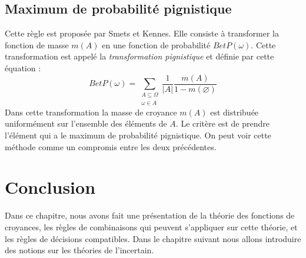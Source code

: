\subsection{Maximum de probabilité pignistique}

Cette règle est proposée par Smets et Kennes. Elle consiste à transformer la fonction
de masse $m(A)$ en une fonction de probabilité $BetP(\omega)$. Cette transformation
est appelé la \emph{transformation pignistique} et définie par cette équation :
\begin{equation}
BetP(\omega) = \sum_{\substack{A \subseteq \Omega \\
\omega \in A}} \frac{1}{|A|}  \frac{m(A)}{1-m(\varnothing)}
\end{equation}
Dans cette transformation la masse de croyance $m(A)$ est distribuée uniformément
sur l’ensemble des éléments de $A$. Le critère est de prendre l'élément qui a le
maximum de probabilité pignistique. On peut voir cette méthode comme un compromis
entre les deux précédentes.

{}
\section*{Conclusion}

Dans ce chapitre, nous avons fait une présentation de la théorie des fonctions de
croyances, les règles de combinaisons qui peuvent s'appliquer sur cette théorie,
et les règles de décisions compatibles. Dans le chapitre suivant nous allons introduire
des notions sur les théories de l'incertain.